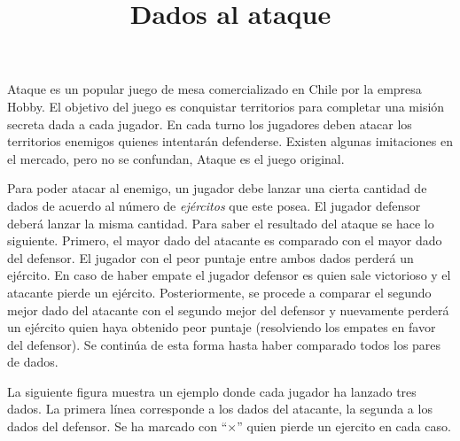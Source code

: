 \documentclass{oci}
\title{Dados al ataque}
\newcommand{\pierde}{$\times$}
\begin{document}
\begin{problemDescription}
  Ataque es un popular juego de mesa comercializado en Chile por la empresa Hobby.
  El objetivo del juego es conquistar territorios para completar una misión
  secreta dada a cada jugador.
  En cada turno los jugadores deben atacar los territorios enemigos quienes
  intentarán defenderse.
  Existen algunas imitaciones en el mercado, pero no se confundan, Ataque es el
  juego original.

  Para poder atacar al enemigo, un jugador debe lanzar una cierta cantidad de
  dados de acuerdo al número de \emph{ejércitos} que este posea.
  El jugador defensor deberá lanzar la misma cantidad.
  Para saber el resultado del ataque se hace lo siguiente.
  Primero, el mayor dado del atacante es comparado con el mayor dado del defensor.
  El jugador con el peor puntaje entre ambos dados perderá un ejército.
  En caso de haber empate el jugador defensor es quien sale victorioso y el
  atacante pierde un ejército.
  Posteriormente, se procede a comparar el segundo mejor dado del atacante con
  el segundo mejor del defensor y nuevamente perderá un ejército quien haya
  obtenido peor puntaje (resolviendo los empates en favor del defensor).
  Se continúa de esta forma hasta haber comparado todos los pares de dados.
  
  La siguiente figura muestra un ejemplo donde cada jugador ha lanzado tres
  dados. La primera línea corresponde a los dados del atacante, la segunda a los dados del defensor.
  Se ha marcado con ``\pierde'' quien pierde un ejercito en cada caso.
  \begin{center}
\end{center}
\end{problemDescription}
\end{document}
